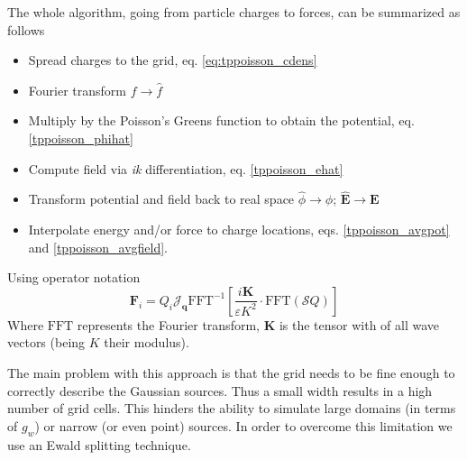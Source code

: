 \documentclass[ twoside,openright,titlepage,numbers=noenddot,%
headinclude,footinclude,cleardoublepage=empty,abstract=on,
BCOR=5mm,paper=a4,fontsize=11pt, dvipsnames
]{scrreprt}
\renewcommand{\vec}[1]{\bm{#1}}
\newcommand{\oper}[1]{\mathcal{#1}}
\newcommand{\ppos}{q}
\begin{document}
The whole algorithm, going from particle charges to forces, can be summarized as follows
\begin{itemize}
\item Spread charges to the grid, eq. \eqref{eq:tppoisson_cdens}
\item Fourier transform $f\rightarrow \hat{f}$
\item Multiply by the Poisson's Greens function to obtain the potential, eq. \eqref{tppoisson_phihat}
\item Compute field via \emph{ik} differentiation, eq. \eqref{tppoisson_ehat}
\item Transform potential and field back to real space $\hat{\phi} \rightarrow \phi$; $\hat{\vec{E}} \rightarrow \vec{E}$
\item Interpolate energy and/or force to charge locations, eqs. \eqref{tppoisson_avgpot} and \eqref{tppoisson_avgfield}.
\end{itemize}
Using operator notation
\begin{equation}
  \label{eq:tppoison_alg}
  \vec{F}_i = Q_i\oper{J}_{\vec{\ppos}}\textrm{FFT}^{-1} \left[\frac{i\vec{K}}{\varepsilon K^2} \cdot \textrm{FFT}\left( \oper{S} Q\right)\right]
\end{equation}
Where $\textrm{FFT}$ represents the Fourier transform, $\vec{K}$ is the tensor with of all wave vectors (being $K$ their modulus).

The main problem with this approach is that the grid needs to be fine enough to correctly describe the Gaussian sources. Thus a small width results in a high number of grid cells. This hinders the ability to simulate large domains (in terms of $g_w$) or narrow (or even point) sources. In order to overcome this limitation we use an Ewald splitting technique\cite{ewaldsplit}.
\end{document}

